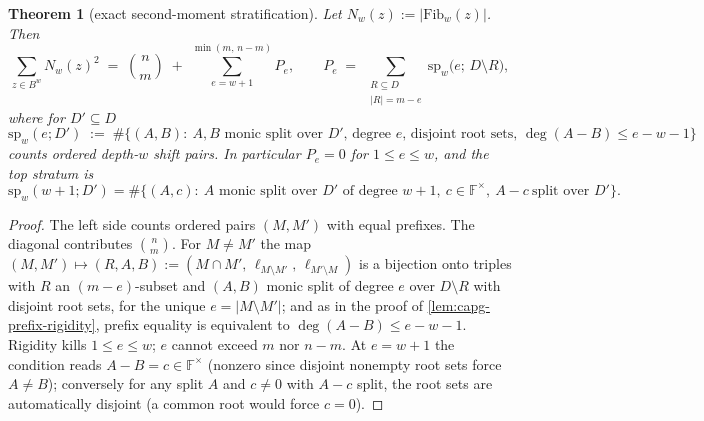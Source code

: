 \documentclass[11pt]{article}
\newtheorem{theorem}{Theorem}[section]
\theoremstyle{definition}
\theoremstyle{remark}
\newcommand{\F}{\mathbb{F}}
\begin{document}
\begin{theorem}[exact second-moment stratification]\label{thm:capg-second-moment}
Let $N_w(z):=|\mathrm{Fib}_w(z)|$.  Then
\[
\sum_{z\in B^{w}} N_w(z)^{2}
\;=\;\binom{n}{m}\;+\;\sum_{e=w+1}^{\min(m,\,n-m)} P_e ,
\qquad
P_e\;=\;\sum_{\substack{R\subseteq D\\ |R|=m-e}}
\mathrm{sp}_w\big(e;\,D\setminus R\big),
\]
where for $D'\subseteq D$
\[
\mathrm{sp}_w(e;D')\;:=\;\#\Big\{(A,B):\ \text{$A,B$ monic split over $D'$,
degree $e$, disjoint root sets, }\deg(A-B)\leq e-w-1\Big\}
\]
counts ordered \emph{depth-$w$ shift pairs}.  In particular $P_e=0$ for
$1\leq e\leq w$, and the top stratum is
\[
\mathrm{sp}_w(w+1;D')=\#\big\{(A,c):\ \text{$A$ monic split over $D'$ of
degree $w+1$},\ c\in\F^{\times},\ A-c\ \text{split over }D'\big\}.
\]
\end{theorem}

\begin{proof}
The left side counts ordered pairs $(M,M')$ with equal prefixes.  The
diagonal contributes $\binom{n}{m}$.  For $M\neq M'$ the map
$(M,M')\mapsto (R,A,B):=(M\cap M',\,\ell_{M\setminus M'},\,
\ell_{M'\setminus M})$ is a bijection onto triples with $R$ an
$(m-e)$-subset and $(A,B)$ monic split of degree $e$ over $D\setminus R$
with disjoint root sets, for the unique $e=|M\setminus M'|$; and as in the
proof of \cref{lem:capg-prefix-rigidity}, prefix equality is equivalent to
$\deg(A-B)\leq e-w-1$.  Rigidity kills $1\leq e\leq w$; $e$ cannot exceed
$m$ nor $n-m$.  At $e=w+1$ the condition reads $A-B=c\in\F^{\times}$
(nonzero since disjoint nonempty root sets force $A\neq B$); conversely for
any split $A$ and $c\neq 0$ with $A-c$ split, the root sets are
automatically disjoint (a common root would force $c=0$).
\end{proof}
\end{document}
